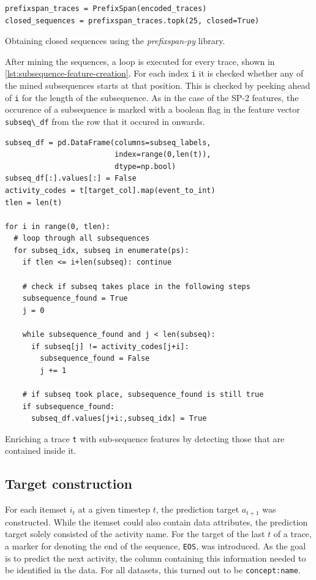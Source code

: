 \begin{listing}[ht]
\begin{verbatim}
prefixspan_traces = PrefixSpan(encoded_traces)
closed_sequences = prefixspan_traces.topk(25, closed=True)
\end{verbatim}
\caption{Obtaining closed sequences using the \textit{prefixspan-py} library.}
\label{lst:pfs-mining}
\end{listing}

After mining the sequences, a loop is executed for every trace, shown in \autoref{lst:subsequence-feature-creation}. For each index \verb=i= it is checked whether any of the mined subsequences starts at that position. This is checked by peeking ahead of \verb=i= for the length of the subsequence. As in the case of the SP-2 features, the occurence of a subsequence is marked with a boolean flag in the feature vector \verb=subseq\_df= from the row that it occured in onwards.

\begin{listing}[ht]
\begin{verbatim}
subseq_df = pd.DataFrame(columns=subseq_labels,
                         index=range(0,len(t)),
                         dtype=np.bool)
subseq_df[:].values[:] = False
activity_codes = t[target_col].map(event_to_int)
tlen = len(t)

for i in range(0, tlen):
  # loop through all subsequences
  for subseq_idx, subseq in enumerate(ps):
    if tlen <= i+len(subseq): continue

    # check if subseq takes place in the following steps
    subsequence_found = True
    j = 0

    while subsequence_found and j < len(subseq):
      if subseq[j] != activity_codes[j+i]:
        subsequence_found = False
        j += 1

    # if subseq took place, subsequence_found is still true
    if subsequence_found:
      subseq_df.values[j+i:,subseq_idx] = True
\end{verbatim}
\caption{Enriching a trace \texttt{t} with sub-sequence features by detecting those that are contained inside it.}
\label{lst:subsequence-feature-creation}
\end{listing}

\subsection*{Target construction}
For each itemset $i_t$ at a given timestep $t$, the prediction target $a_{t+1}$ was constructed. While the itemset could also contain data attributes, the prediction target solely consisted of the activity name. For the target of the last $t$ of a trace, a marker for denoting the end of the sequence, \verb=EOS=, was introduced.
As the goal is to predict the next activity, the column containing this information needed to be identified in the data. For all datasets, this turned out to be \verb=concept:name=.

